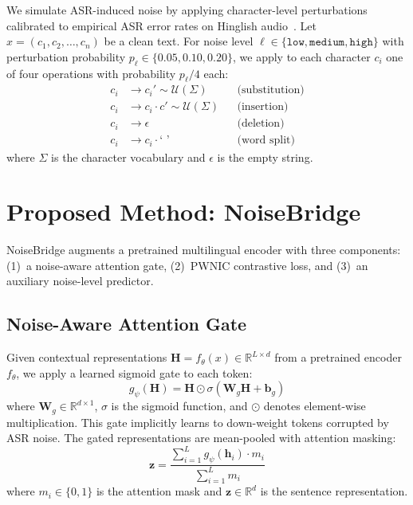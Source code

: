 \documentclass[conference]{IEEEtran}
\begin{document}
We simulate ASR-induced noise by applying character-level perturbations calibrated to empirical ASR error rates on Hinglish audio~\cite{shah2020learning}. Let $x = (c_1, c_2, \ldots, c_n)$ be a clean text. For noise level $\ell \in \{\texttt{low}, \texttt{medium}, \texttt{high}\}$ with perturbation probability $p_\ell \in \{0.05, 0.10, 0.20\}$, we apply to each character $c_i$ one of four operations with probability $p_\ell / 4$ each:
\begin{align}
    c_i &\to c_i' \sim \mathcal{U}(\Sigma) && \text{(substitution)} \\
    c_i &\to c_i \cdot c' \sim \mathcal{U}(\Sigma) && \text{(insertion)} \\
    c_i &\to \epsilon && \text{(deletion)} \\
    c_i &\to c_i \cdot \texttt{` '} && \text{(word split)}
\end{align}
where $\Sigma$ is the character vocabulary and $\epsilon$ is the empty string.

\section{Proposed Method: NoiseBridge}
\label{sec:method}

NoiseBridge augments a pretrained multilingual encoder with three components: (1)~a noise-aware attention gate, (2)~PWNIC contrastive loss, and (3)~an auxiliary noise-level predictor.

\subsection{Noise-Aware Attention Gate}

Given contextual representations $\mathbf{H} = f_\theta(x) \in \mathbb{R}^{L \times d}$ from a pretrained encoder $f_\theta$, we apply a learned sigmoid gate to each token:
\begin{equation}
    g_\psi(\mathbf{H}) = \mathbf{H} \odot \sigma(\mathbf{W}_g \mathbf{H} + \mathbf{b}_g)
    \label{eq:gate}
\end{equation}
where $\mathbf{W}_g \in \mathbb{R}^{d \times 1}$, $\sigma$ is the sigmoid function, and $\odot$ denotes element-wise multiplication. This gate implicitly learns to down-weight tokens corrupted by ASR noise. The gated representations are mean-pooled with attention masking:
\begin{equation}
    \mathbf{z} = \frac{\sum_{i=1}^{L} g_\psi(\mathbf{h}_i) \cdot m_i}{\sum_{i=1}^{L} m_i}
    \label{eq:pool}
\end{equation}
where $m_i \in \{0, 1\}$ is the attention mask and $\mathbf{z} \in \mathbb{R}^d$ is the sentence representation.
\end{document}

